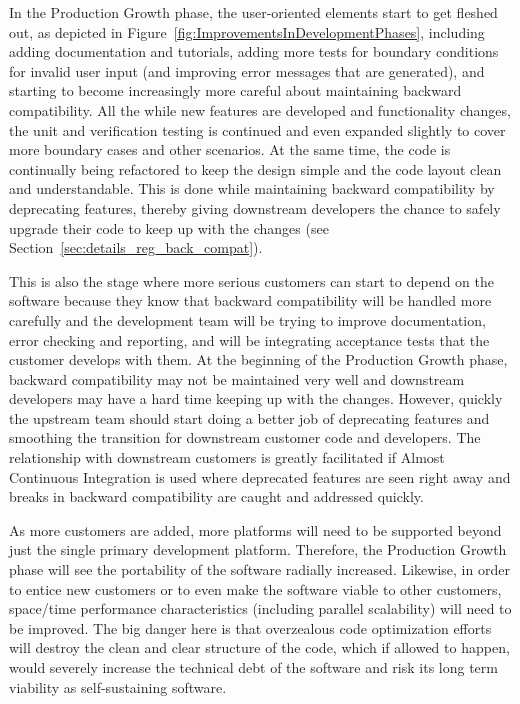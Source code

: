 \documentclass[11pt]{SANDreport}
\begin{document}
In the Production Growth phase, the user-oriented elements start to
get fleshed out, as depicted in
Figure~\ref{fig:ImprovementsInDevelopmentPhases}, including adding
documentation and tutorials, adding more tests for boundary conditions
for invalid user input (and improving error messages that are
generated), and starting to become increasingly more careful about
maintaining backward compatibility.  All the while new features are
developed and functionality changes, the unit and verification testing
is continued and even expanded slightly to cover more boundary cases
and other scenarios.  At the same time, the code is continually being
refactored to keep the design simple and the code layout clean and
understandable.  This is done while maintaining backward compatibility
by deprecating features, thereby giving downstream developers the
chance to safely upgrade their code to keep up with the changes (see
Section~\ref{sec:details_reg_back_compat}).

This is also the stage where more serious customers can start to
depend on the software because they know that backward compatibility
will be handled more carefully and the development team will be trying
to improve documentation, error checking and reporting, and will be
integrating acceptance tests that the customer develops with them.  At
the beginning of the Production Growth phase, backward compatibility
may not be maintained very well and downstream developers may have a
hard time keeping up with the changes.  However, quickly the upstream
team should start doing a better job of deprecating features and
smoothing the transition for downstream customer code and developers.
The relationship with downstream customers is greatly facilitated if
Almost Continuous Integration {}\cite{SoftwareIntegrationforCSE09} is
used where deprecated features are seen right away and breaks in
backward compatibility are caught and addressed quickly.

As more customers are added, more platforms will need to be supported
beyond just the single primary development platform.  Therefore, the
Production Growth phase will see the portability of the software
radially increased.  Likewise, in order to entice new customers or to
even make the software viable to other customers, space/time
performance characteristics (including parallel scalability) will need
to be improved.  The big danger here is that overzealous code
optimization efforts will destroy the clean and clear structure of the
code, which if allowed to happen, would severely increase the
technical debt of the software and risk its long term viability as
self-sustaining software.
\end{document}
